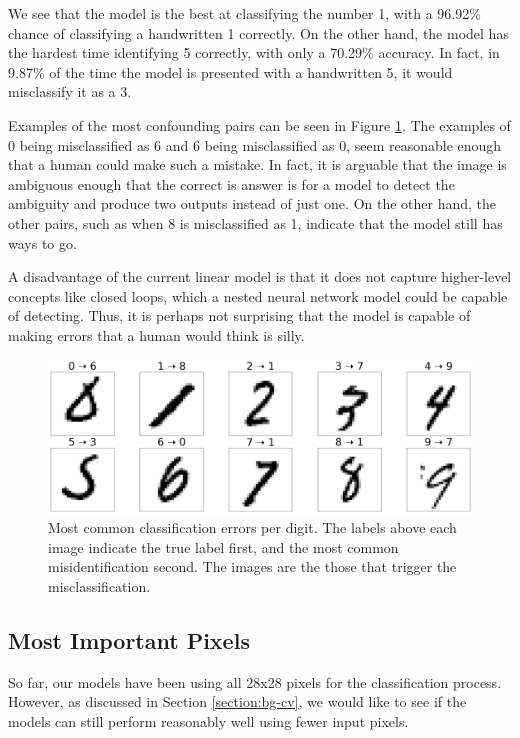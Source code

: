 \documentclass[letterpaper, 10 pt, conference]{ieeeconf}  %
\begin{document}
We see that the model is the best at classifying the number 1, with a 96.92\% chance of classifying a handwritten 1 correctly. On the other hand, the model has the hardest time identifying 5 correctly, with only a 70.29\% accuracy. In fact, in 9.87\% of the time the  model is presented with a handwritten 5, it would misclassify it as a 3.

Examples of the most confounding pairs can be seen in Figure \ref{fig:per_digit_error}. The examples of 0 being misclassified as 6 and 6 being misclassified as 0, seem reasonable enough that a human could make such a mistake. In fact, it is arguable that the image is ambiguous enough that the correct is answer is for a model to detect the ambiguity and produce two outputs instead of just one. On the other hand, the other pairs, such as when 8 is misclassified as 1, indicate that the model still has ways to go.

A disadvantage of the current linear model is that it does not capture higher-level concepts like closed loops, which a nested neural network model could be capable of detecting. Thus, it is perhaps not surprising that the model is capable of making errors that a human would think is silly.

\begin{figure}[htp] 
\centering
\includegraphics[width=\textwidth]{images/common_error.png}
\caption{Most common classification errors per digit. The labels above each image indicate the true label first, and the most common misidentification second. The images are the those that trigger the misclassification.}
\label{fig:per_digit_error}
\end{figure}

\subsection{Most Important Pixels}
So far, our models have been using all 28x28 pixels for the classification process. However, as discussed in Section \ref{section:bg-cv}, we would like to see if the models can still perform reasonably well using fewer input pixels.
\end{document}
